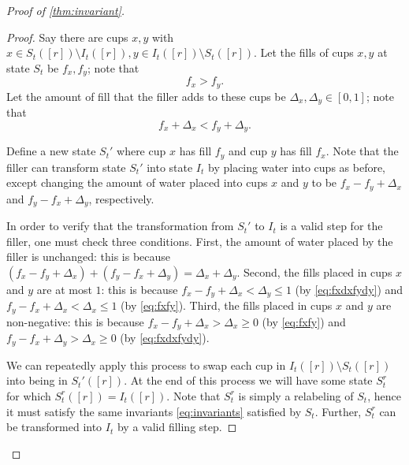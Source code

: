 \begin{proof}[Proof of \cref{thm:invariant}]
\begin{proof}
Say there are cups $x, y$ with $x\in S_t([r]) \setminus I_t([r]), y \in
 I_t([r])\setminus S_t([r])$. Let the fills of cups $x,y$ at state $S_t$
 be $f_x, f_y$; note that 
 \begin{equation}
     f_x > f_y.
     \label{eq:fxfy}
 \end{equation} Let the amount of fill that the filler
 adds to these cups be $\Delta_x, \Delta_y \in [0,1]$; note that 
 \begin{equation}
 f_x +\Delta_x <f_y + \Delta_y.
 \label{eq:fxdxfydy}
 \end{equation}
 
Define a new state $S_t'$ where cup $x$ has fill $f_y$ and cup $y$ has fill
$f_x$. Note that the filler can transform state $S_t'$ into state $I_t$ by
placing water into cups as before, except changing the amount of water placed
into cups $x$ and $y$ to be  $f_x-f_y+\Delta_x$ and $f_y-f_x + \Delta_y$,
respectively.

In order to verify that the transformation from $S_t'$ to $I_t$ is a valid step
for the filler, one must check three conditions. First, the amount of water
placed by the filler is unchanged: this is because $(f_x-f_y + \Delta_x) +
(f_y-f_x+\Delta_y) = \Delta_x + \Delta_y$. Second, the fills placed in cups $x$
and $y$ are at most $1$: this is because $f_x-f_y+\Delta_x<\Delta_y \le 1$ (by
\eqref{eq:fxdxfydy}) and $f_y-f_x + \Delta_x < \Delta_x \le 1$ (by
\eqref{eq:fxfy}). Third, the fills placed in cups $x$ and $y$ are non-negative:
this is because $f_x-f_y + \Delta_x > \Delta_x \ge 0$ (by \eqref{eq:fxfy})
and $f_y-f_x+\Delta_y > \Delta_x \ge 0$ (by
\eqref{eq:fxdxfydy}). 

We can repeatedly apply this process to swap each cup in $I_t([r])\setminus
S_t([r])$ into being in $S_t'([r])$. At
the end of this process we will have some state $S_t^r$ for which
$S_t^r([r]) = I_t([r])$. Note that $S_t^r$ is simply a relabeling of $S_t$,
hence it must satisfy the same invariants \eqref{eq:invariants} satisfied by
$S_t$. Further, $S_t^r$ can be transformed into $I_t$ by a valid filling step.


\end{proof}
\end{proof}

